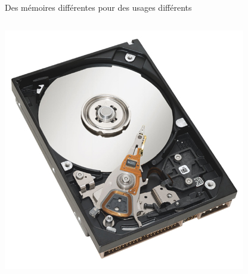 \begin{frame}{Des mémoires différentes pour des usages différents}
\begin{columns}
\begin{column}{.3\linewidth}
      \includegraphics[width=\linewidth]{img/s01/disque_dur.png}
    \end{column}
  \end{columns}
\end{frame}
